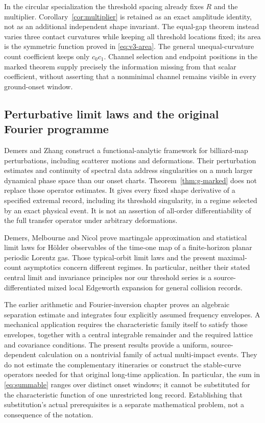 In the circular specialization the threshold spacing already fixes
$R$ and the multiplier. Corollary~\ref{cor:multiplier} is retained
as an exact amplitude identity, not as an additional independent shape
invariant. The equal-gap theorem instead varies three contact curvatures
while keeping all threshold locations fixed; its area is the symmetric
function proved in \eqref{eq:v3-area}. The general unequal-curvature
count coefficient keeps only $c_0c_1$. Channel selection and endpoint
positions in the marked theorem supply precisely the information
missing from that scalar coefficient, without asserting that a
nonminimal channel remains visible in every ground-onset window.

\subsection{Perturbative limit laws and the original Fourier programme}
Demers and Zhang \cite{DemersZhang} construct a functional-analytic
framework for billiard-map perturbations, including scatterer motions and
deformations. Their perturbation estimates and continuity of spectral
data address singularities on a much larger dynamical phase space than
our onset charts. Theorem~\ref{thm:g-marked} does not replace those operator
estimates. It gives every fixed shape derivative of a specified extremal
record, including its threshold singularity, in a regime selected by an
exact physical event. It is not an assertion of all-order differentiability
of the full transfer operator under arbitrary deformations.

Demers, Melbourne and Nicol \cite{DMN} prove martingale approximation and
statistical limit laws for H\"older observables of the time-one map of a
finite-horizon planar periodic Lorentz gas. Those typical-orbit limit laws
and the present maximal-count asymptotics concern different regimes.
In particular, neither their stated central limit and invariance principles
nor our threshold series is a source-differentiated mixed local Edgeworth
expansion for general collision records.

The earlier arithmetic and Fourier-inversion chapter \cite{A2R33} proves
an algebraic separation estimate and integrates four explicitly assumed
frequency envelopes. A mechanical application requires the characteristic
family itself to satisfy those envelopes, together with a central
integrable remainder and the required lattice and covariance conditions.
The present results provide a uniform, source-dependent calculation on a
nontrivial family of actual multi-impact events. They do not estimate the
complementary itineraries or construct the stable-curve operators needed
for that original long-time application. In particular, the sum in
\eqref{eq:summable} ranges over distinct onset windows; it cannot be
substituted for the characteristic function of one unrestricted long
record. Establishing that substitution's actual prerequisites is a
separate mathematical problem, not a consequence of the notation.

